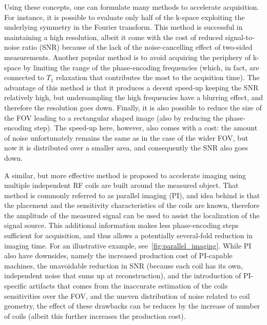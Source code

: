 Using these concepts, one can formulate many methods to accelerate acquisition. For instance, it is possible to evaluate only half of the k-space exploiting the underlying symmetry in the Fourier transform. This method is successful in maintaining a high resolution, albeit it come with the cost of reduced signal-to-noise ratio (SNR) because of the lack of the noise-cancelling effect of two-sided measurements. Another popular method is to avoid acquiring the periphery of k-space by limiting the range of the phase-encoding frequencies (which, in fact, are connected to $T_1$ relaxation that contributes the most to the acqisition time). The advantage of this method is that it produces a decent speed-up keeping the SNR relatively high, but undersampling the high frequencies have a blurring effect, and therefore the resolution goes down. Finally, it is also possible to reduce the size of the FOV leading to a rectangular shaped image (also by reducing the phase-encoding step). The speed-up here, however, also comes with a cost: the amount of noise unfortunately remains the same as in the case of the wider FOV, but now it is distributed over a smaller area, and consequently the SNR also goes down.

A similar, but more effective method is proposed to accelerate imaging using multiple independent RF coils are built around the measured object. That method is commonly referred to as parallel imaging (PI), and idea behind is that the placement and the sensitivity characteristics of the coils are known, therefore the amplitude of the measured signal can be used to assist the localization of the signal source. This additional information makes less phase-encoding steps sufficient for acquisition, and thus allows a potentially several-fold reduction in imaging time. For an illustrative example, see~\ref{fig:parallel_imaging}. While PI also have downsides, namely the increased production cost of PI-capable machines, the unavoidable reduction in SNR (because each coil has its own, independent noise that sums up at reconstruction), and the introduction of PI-specific artifacts that comes from the inaccurate estimation of the coils sensitivities over the FOV, and the uneven distribution of noise related to coil geometry, the effect of these drawbacks can be reduces by the increase of number of coils (albeit this further increases the production cost).


